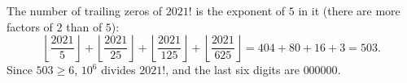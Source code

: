 The number of trailing zeros of $2021!$ is the exponent of $5$ in it (there are more factors of $2$ than of $5$):
\[\left\lfloor\dfrac{2021}{5}\right\rfloor+\left\lfloor\dfrac{2021}{25}\right\rfloor+\left\lfloor\dfrac{2021}{125}\right\rfloor+\left\lfloor\dfrac{2021}{625}\right\rfloor=404+80+16+3=503.\]
Since $503\ge6$, $10^6$ divides $2021!$, and the last six digits are $\boxed{000000}$.
